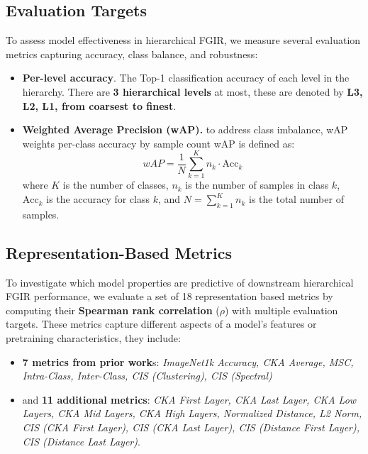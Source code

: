 \documentclass[10pt,twocolumn]{article}
\begin{document}
\subsection{Evaluation Targets}
To assess model effectiveness in hierarchical FGIR, we measure several evaluation metrics capturing accuracy, class balance, and robustness:
\begin{itemize} [topsep=3pt, itemsep=2pt, parsep=1pt]
    \item \textbf{Per-level accuracy}. The Top-1 classification accuracy of each level in the hierarchy. There are \textbf{3 hierarchical levels} at most, these are denoted by \textbf{L3, L2, L1, from coarsest to finest}.

    \item \textbf{Weighted Average Precision (wAP).}  
    to address class imbalance, wAP weights per-class accuracy by sample count
    wAP is defined as:
    \[
    wAP = \frac{1}{N} \sum_{k=1}^{K} n_k \cdot \text{Acc}_k
    \]
    where $K$ is the number of classes, $n_k$ is the number of samples in class $k$, $\text{Acc}_k$ is the accuracy for class $k$, and $N = \sum_{k=1}^{K} n_k$ is the total number of samples.
    
    
\end{itemize}

\subsection{Representation-Based Metrics}
To investigate which model properties are predictive of downstream hierarchical FGIR performance, we evaluate a set of 18 representation based metrics by computing their \textbf{Spearman rank correlation} ($\rho$) with multiple evaluation targets. These metrics capture different aspects of a model’s features or pretraining characteristics, they include: 
\begin{itemize} [topsep=3pt, itemsep=2pt, parsep=1pt]
\item \textbf{7 metrics from prior work}s\cite{kornblith_better_2019, nayman_diverse_2022}:
\textit{ImageNet1k Accuracy, CKA Average, MSC, Intra-Class, Inter-Class, CIS (Clustering), CIS (Spectral)} 
\item and \textbf{11 additional metrics}:
\textit{CKA First Layer, CKA Last Layer, CKA Low Layers, CKA Mid Layers, CKA High Layers, Normalized Distance, L2 Norm, CIS (CKA First Layer), CIS (CKA Last Layer), CIS (Distance First Layer), CIS (Distance Last Layer)}. 
\end{itemize}
\end{document}
